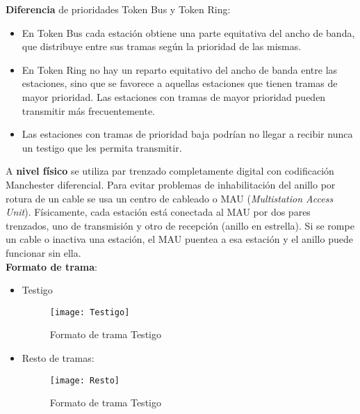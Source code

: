 \documentclass[10pt,portrait, twocolumn]{article}
\begin{document}
\textbf{Diferencia} de prioridades Token Bus y Token Ring:

	\begin{itemize}
		\item En Token Bus cada estación obtiene una parte equitativa del ancho de banda, que distribuye entre sus tramas según la prioridad de las mismas.
		\item En Token Ring no hay un reparto equitativo del ancho de banda entre las estaciones, sino que se favorece a aquellas estaciones que tienen tramas de mayor prioridad. Las estaciones con tramas de mayor prioridad pueden transmitir más frecuentemente.
		\item Las estaciones con tramas de prioridad baja podrían no llegar a recibir nunca un testigo que les permita transmitir.
	\end{itemize}
	
A \textbf{nivel físico} se utiliza par trenzado completamente digital con codificación Manchester diferencial. Para evitar problemas de inhabilitación del anillo por rotura de un cable se usa un centro de cableado o MAU (\textit{Multistation Access Unit}). Físicamente, cada estación está conectada al MAU por dos pares trenzados, uno de transmisión y otro de recepción (anillo en estrella). Si se rompe un cable o inactiva una estación, el MAU puentea a esa estación y el anillo puede funcionar sin ella.\\
	
\textbf{Formato de trama}:

	\begin{itemize}
	\item Testigo
		
		\begin{figure}[!ht]	
			\centering
		    	\texttt{[image: Testigo]}
			\caption{Formato de trama Testigo}
		\end{figure}  
		
	\item Resto de tramas:
	
		\begin{figure}[!ht]	
			\centering
		    	\texttt{[image: Resto]}
			\caption{Formato de trama Testigo}
		\end{figure}  
	\end{itemize}
	
\end{document}
